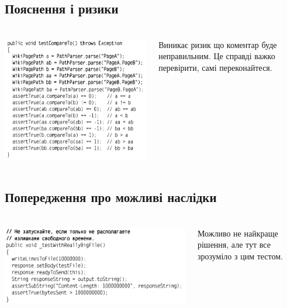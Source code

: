 \documentclass[12pt,pdf,utf8,ukrainian,aspectratio=169]{beamer}
\makeatletter
\newcommand*{\currentname}{\@currentlabelname}
\makeatother
\begin{document}
	\subsection{Пояснення і ризики}
	\begin{frame}\frametitle{\currentname}
	\begin{columns}
		\begin{column}{7cm}
			\includegraphics[scale=0.45]{clean_code_6.png}
		\end{column}
		\begin{column}{5cm} 
			\small
			Виникає ризик що коментар буде неправильним. Це справді важко перевірити, самі переконайтеся.
		\end{column}
	\end{columns}	
	\end{frame}

	\subsection{Попередження про можливі наслідки}
	\begin{frame}\frametitle{\currentname}
		\begin{columns}
			\begin{column}{8cm}
				\includegraphics[scale=0.45]{clean_code_7.png}
			\end{column}
			\begin{column}{5cm} 
				\small
				Можливо не найкраще рішення, але тут все зрозуміло з цим тестом.
			\end{column}
		\end{columns}	
	\end{frame}
\end{document}

